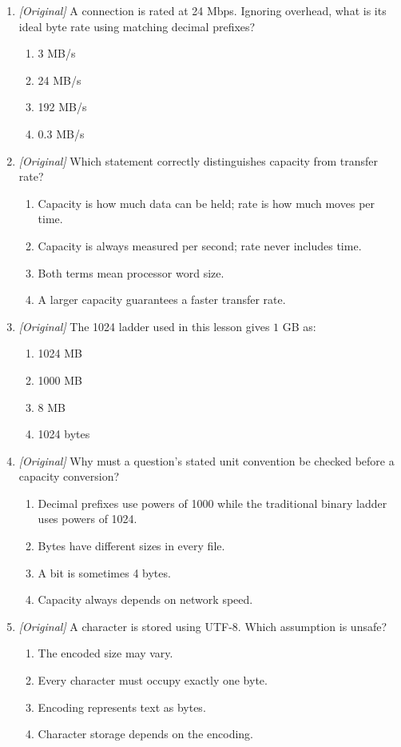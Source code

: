 \begin{enumerate}[label=\textbf{Q\arabic*.}, leftmargin=*]
\begin{enumerate}[label=\Alph*.]
    \item I, II, and III
  \end{enumerate}
\item \textit{[Original]} A connection is rated at 24 Mbps. Ignoring
  overhead, what is its ideal byte rate using matching decimal prefixes?
  \begin{enumerate}[label=\Alph*.]
    \item 3 MB/s
    \item 24 MB/s
    \item 192 MB/s
    \item 0.3 MB/s
  \end{enumerate}
\item \textit{[Original]} Which statement correctly distinguishes capacity
  from transfer rate?
  \begin{enumerate}[label=\Alph*.]
    \item Capacity is how much data can be held; rate is how much moves per
      time.
    \item Capacity is always measured per second; rate never includes time.
    \item Both terms mean processor word size.
    \item A larger capacity guarantees a faster transfer rate.
  \end{enumerate}
\item \textit{[Original]} The 1024 ladder used in this lesson gives
  $1$ GB as:
  \begin{enumerate}[label=\Alph*.]
    \item 1024 MB
    \item 1000 MB
    \item 8 MB
    \item 1024 bytes
  \end{enumerate}
\item \textit{[Original]} Why must a question's stated unit convention be
  checked before a capacity conversion?
  \begin{enumerate}[label=\Alph*.]
    \item Decimal prefixes use powers of 1000 while the traditional binary
      ladder uses powers of 1024.
    \item Bytes have different sizes in every file.
    \item A bit is sometimes 4 bytes.
    \item Capacity always depends on network speed.
  \end{enumerate}
\item \textit{[Original]} A character is stored using UTF-8. Which assumption
  is unsafe?
  \begin{enumerate}[label=\Alph*.]
    \item The encoded size may vary.
    \item Every character must occupy exactly one byte.
    \item Encoding represents text as bytes.
    \item Character storage depends on the encoding.
  \end{enumerate}


\end{enumerate}
